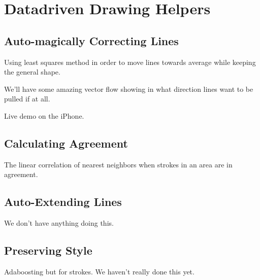 \section{Datadriven Drawing Helpers}

\subsection{Auto-magically Correcting Lines}
Using least squares method in order to move lines towards average while keeping the general shape.

We'll have some amazing vector flow showing in what direction lines want to be pulled if at all.

Live demo on the iPhone.

\subsection{Calculating Agreement}
The linear correlation of nearest neighbors when strokes in an area are in agreement.

\subsection{Auto-Extending Lines}
We don't have anything doing this.

\subsection{Preserving Style}
Adaboosting but for strokes. We haven't really done this yet.

